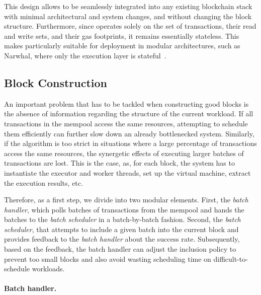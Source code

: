 This design allows \sys to be seamlessly integrated into any existing blockchain stack with minimal architectural and system changes, and without changing the block structure. Furthermore, since \sys operates solely on the set of transactions, their read and write sets, and their gas footprints, it remains essentially stateless. This makes \sys particularly suitable for deployment in modular architectures, such as Narwhal, where only the execution layer is stateful~\cite{narwahl}.  

\subsection{Block Construction}

An important problem that has to be tackled when constructing good blocks is the absence of information regarding the structure of the current workload. If all transactions in the mempool access the same resources, attempting to schedule them efficiently can further slow down an already bottlenecked system. Similarly, if the algorithm is too strict in situations where a large percentage of transactions access the same resources, the synergetic effects of executing larger batches of transactions are lost. This is the case, as, for each block, the system has to instantiate the executor and worker threads, set up the virtual machine, extract the execution results, etc.

Therefore, as a first step, we divide \sys into two modular elements. First, the \textit{batch handler}, which polls batches of transactions from the mempool and hands the batches to the \textit{batch scheduler} in a batch-by-batch fashion. Second, the \textit{batch scheduler}, that attempts to include a given batch into the current block and provides feedback to the \textit{batch handler} about the success rate.
Subsequently, based on the feedback, the batch handler can adjust the inclusion policy to prevent too small blocks and also avoid wasting scheduling time on difficult-to-schedule workloads.

\paragraph{Batch handler.}

